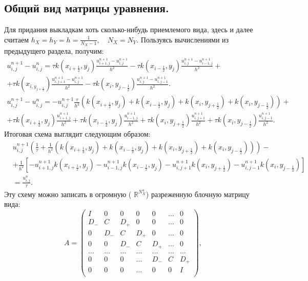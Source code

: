 \documentclass[14pt,a4paper]{extarticle}
\newcommand{\1}{\mathbbm{1}}
\newcommand{\R}{\mathbb{R}}
\begin{document}
\subsection{Общий вид матрицы уравнения.} \label{generalmatrix2d}
Для придания выкладкам хоть сколько-нибудь приемлемого вида, здесь и далее считаем $h_X = h_Y = h = \frac{1}{N_X - 1}, \quad N_X = N_Y$.
Пользуясь вычислениями из предыдущего раздела, получим:
\begin{align*}
    u^{n+1}_{i, j} - u^n_{i, j} = \tau k(x_{i + \frac{1}{2}}, y_j) \frac{u^{n+1}_{i+1, j} - u^{n+1}_{i, j}}{h^2} - \tau k(x_{i- \frac{1}{2}}, y_j) \frac{u^{n+1}_{i, j} - u^{n+1}_{i-1, j}}{h^2} + \\
    + \tau k(x_{i, y_{j + \frac{1}{2}}}) \frac{u^{n+1}_{i, j+1} - u^{n+1}_{i, j}}{h^2} - \tau k(x_{i}, y_{j - \frac{1}{2}}) \frac{u^{n+1}_{i, j} - u^{n+1}_{i, j-1}}{h^2}. \\
    u^{n+1}_{i, j} - u^n_{i, j} = - u^{n+1}_{i, j} \frac{\tau}{h^2} \left(k(x_{i + \frac{1}{2}}, y_{j}) + k(x_{i - \frac{1}{2}}, y_{j}) + k(x_{i}, y_{j+ \frac{1}{2}}) + k(x_{i}, y_{j- \frac{1}{2}})\right) +\\
    + \tau k(x_{i + \frac{1}{2}}, y_{j}) \frac{u^{n+1}_{i+1,j} }{h^2} 
    + \tau k(x_{i- \frac{1}{2}}, y_{j}) \frac{u^{n+1}_{i-1, j}}{h^2}
    + \tau k(x_{i}, y_{j+ \frac{1}{2}}) \frac{u^{n+1}_{i,j+1} }{h^2} 
    + \tau k(x_{i}, y_{j- \frac{1}{2}}) \frac{u^{n+1}_{i, j-1}}{h^2}. 
\end{align*}
Итоговая схема выглядит следующим образом:
\begin{align*}
    &u^{n+1}_{i, j}\left(\frac{1}{\tau} + \frac{1}{h^2} \left(k(x_{i + \frac{1}{2}}, y_{j}) + k(x_{i - \frac{1}{2}}, y_{j}) + k(x_{i}, y_{j+ \frac{1}{2}}) + k(x_{i}, y_{j- \frac{1}{2}})\right)\right) -\\
    &+ \frac{1}{h^2} \left[- u^{n+1}_{i+1,j} k(x_{i + \frac{1}{2}}, y_{j}) 
    - u^{n+1}_{i-1, j} k(x_{i- \frac{1}{2}}, y_{j})
    - u^{n+1}_{i,j+1} k(x_{i}, y_{j+ \frac{1}{2}}) 
    - u^{n+1}_{i, j-1} k(x_{i}, y_{j- \frac{1}{2}}) \right]\\ &= \frac{u^n_{i, j}}{\tau}.
\end{align*}
Эту схему можно записать в огромную ( $\R ^{N_X^4}$) разреженную блочную матрицу вида:
$$A = \begin{pmatrix}
    I   & 0   & 0     & 0   & 0   & \ldots & 0 \\
    D_-   & C   & D_+   & 0   & 0   & \ldots & 0 \\
    0   & D_-   & C     & D_+ & 0   & \ldots & 0 \\
    0   & 0   & D_-   & C   & D_+ & \ldots & 0 \\
    \ldots & \ldots & \ldots & \ldots & \ldots & \ldots & \ldots \\
    0   & 0   & 0    & \ldots & D_- & C & D_+ \\
    0   & 0   & 0     & \ldots & 0 & 0 & I \\
\end{pmatrix},
$$
\end{document}
